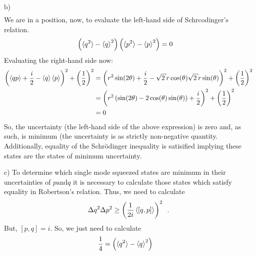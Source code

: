 \begin{homeworkProblem}[Problem 10]
\begin{homeworkSection}{b)}
\begin{align}
   \end{align}
   We are in a position, now, to evaluate the left-hand side of Schrcodinger's
   relation.
   \begin{align}
      \left( \braket{q^2} - \braket{q}^2 \right)
      \left( \braket{p^2} - \braket{p}^2 \right)  &=
      0
   \end{align}
   Evaluating the right-hand side now:
   \begin{align}
      \left(
      \braket{qp} + \frac{i}{2} - \braket{q} \braket{p} \right)^2 +
      \left( \frac{1}{2} \right)^2  &=
      \left( r^{2} \sin(2\theta) + \frac{i}{2} - \sqrt{2}r \cos(\theta) \sqrt{2} r
      \sin(\theta) \right)^2 + \left( \frac{1}{2} \right)^{2} \\
      &= \left( r^{2}\left(\sin(2\theta) - 2 \cos(\theta)\sin(\theta)\right) +
   \frac{i}{2} \right)^2 + \left(\frac{1}{2}\right)^2 \\
   &= 0
   \end{align}
   So, the uncertainty (the left-hand side of the above expression) is zero and,
   as such, is minimum (the uncertainty is as strictly non-negative quantity.
   Additionally, equality of the Schr\"{o}dinger inequality is satisified implying these states are the
   states of minimum uncertainty.
   \begin{homeworkSection}{c)}
      To determine which single mode squeezed states are minimum in their
      uncertainties of $ p \text{and} q $ it is necessary to calculate those
      states which satisfy equality in Robertson's relation. Thus, we need to
      calculate
      \begin{align}
         \Delta q^2 \Delta p^2 \ge \left( \frac{1}{2i} \braket{[q,p]}
         \right)^2 \enskip.
      \end{align}
      But, $ [p,q] = i $. So, we just need to calculate
      \begin{align}
         \frac{1}{4} &=
         \left( \braket{q^2} - \braket{q}^2 \right)

\end{align}
\end{homeworkSection}
\end{homeworkSection}
\end{homeworkProblem}

